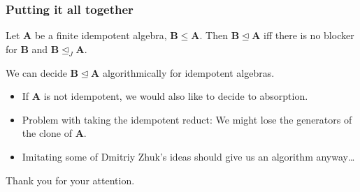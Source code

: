 \documentclass[violet,handout]{beamer}
\def\algA{{\mathbf A}}
\def\algB{{\mathbf B}}
\def\absorbs{\operatorname{\trianglelefteq}}
\begin{document}
    \begin{frame}
      \frametitle{Putting it all together}
      \pause
      \begin{theorem}
	Let $\algA$ be a finite idempotent algebra, $\algB\leq \algA$.
	Then $\algB\absorbs \algA$ iff there is no blocker for $\algB$ and $\algB\absorbs_J \algA$.
      \end{theorem}\pause
      \begin{corollary}
      We can decide $\algB\absorbs \algA$ algorithmically for idempotent algebras.
    \end{corollary}
    \end{frame}
    \begin{frame}
      \begin{itemize}
	  \frametitle{Nonidempotent algebras}
	\pause\item If $\algA$ is not idempotent, we would also like to decide
	  to absorption.
	  \pause\item Problem with taking the idempotent reduct: We might lose 
	    the generators of the clone of $\algA$.
	  \pause\item Imitating some of Dmitriy Zhuk's ideas should give us an
	    algorithm anyway\dots
      \end{itemize}
    \end{frame}
\begin{frame}
\centerline{Thank you for your attention.}
\end{frame}
\end{document}
